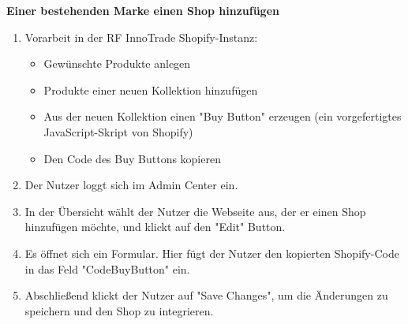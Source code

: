 \textbf{Einer bestehenden Marke einen Shop hinzufügen}

\begin{enumerate}
    \item Vorarbeit in der RF InnoTrade Shopify-Instanz:
    \begin{itemize}
        \item Gewünschte Produkte anlegen
        \item Produkte einer neuen Kollektion hinzufügen
        \item Aus der neuen Kollektion einen "Buy Button" erzeugen (ein vorgefertigtes JavaScript-Skript von Shopify)
        \item Den Code des Buy Buttons kopieren
    \end{itemize}
    \item Der Nutzer loggt sich im Admin Center ein.
    \item In der Übersicht wählt der Nutzer die Webseite aus, der er einen Shop hinzufügen möchte, und klickt auf den "Edit" Button.
    \item Es öffnet sich ein Formular. Hier fügt der Nutzer den kopierten Shopify-Code in das Feld "CodeBuyButton" ein.
    \item Abschließend klickt der Nutzer auf "Save Changes", um die Änderungen zu speichern und den Shop zu integrieren.
\end{enumerate}